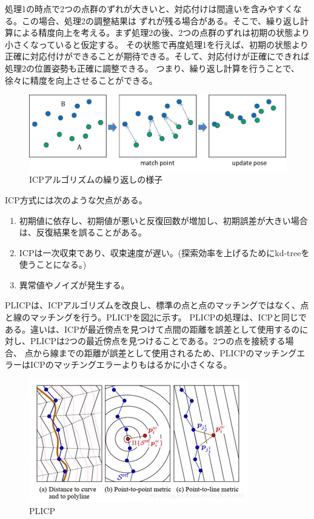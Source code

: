 処理1の時点で2つの点群のずれが大きいと、対応付けは間違いを含みやすくなる。この場合、処理2の調整結果は
ずれが残る場合がある。そこで、繰り返し計算による精度向上を考える。まず処理2の後、2つの点群のずれは初期の状態より小さくなっていると仮定する。
その状態で再度処理1を行えば、初期の状態より正確に対応付けができることが期待できる。そして、対応付けが正確にできれば処理2の位置姿勢も正確に調整できる。
つまり、繰り返し計算を行うことで、徐々に精度を向上させることができる。

\begin{figure}[h]
  \begin{center}
    \includegraphics[width=.8\linewidth]{img/slam_25.jpg}
    \caption{ICPアルゴリズムの繰り返しの様子}
    \label{slam:icp_process}
  \end{center}
\end{figure}

ICP方式には次のような欠点がある。
\begin{enumerate}
  \item 初期値に依存し、初期値が悪いと反復回数が増加し、初期誤差が大きい場合は、反復結果を誤ることがある。
  \item ICPは一次収束であり、収束速度が遅い。(探索効率を上げるためにkd-treeを使うことになる。)
  \item 異常値やノイズが発生する。
\end{enumerate}

PLICPは、ICPアルゴリズムを改良し、標準の点と点のマッチングではなく、点と線のマッチングを行う。PLICPを図\ref{slam:plicp}に示す。
PLICPの処理は、ICPと同じである。違いは、ICPが最近傍点を見つけて点間の距離を誤差として使用するのに対し、PLICPは2つの最近傍点を見つけることである。2つの点を接続する場合、
点から線までの距離が誤差として使用されるため、PLICPのマッチングエラーはICPのマッチングエラーよりもはるかに小さくなる。

\begin{figure}[h]
  \begin{center}
    \includegraphics[width=.8\linewidth]{img/slam_26.jpg}
    \caption{PLICP}
    \label{slam:plicp}
  \end{center}
\end{figure}

